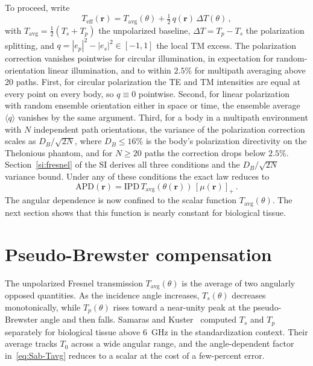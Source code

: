 \documentclass[journal,twocolumn,10pt]{IEEEtran}
\theoremstyle{plain}
\theoremstyle{remark}
\newcommand{\rr}{\mathbf{r}}
\newcommand{\IPD}{\mathrm{IPD}}
\newcommand{\APD}{\mathrm{APD}}
\newcommand{\Teff}{T_{\mathrm{eff}}}
\newcommand{\Tavg}{T_{\mathrm{avg}}}
\newcommand{\pospart}[1]{\left[#1\right]_{+}}
\begin{document}
To proceed, write
\begin{equation}\label{eq:Teff-decomp}
  \Teff(\rr) = \Tavg(\theta) + \tfrac{1}{2}\,q(\rr)\,\Delta T(\theta)\, ,
\end{equation}
with $\Tavg = \tfrac{1}{2}(T_s + T_p)$ the unpolarized baseline,
$\Delta T = T_p - T_s$ the polarization splitting, and $q = |e_p|^2 -
|e_s|^2 \in [-1, 1]$ the local TM excess. The polarization correction
vanishes pointwise for circular illumination, in expectation for
random-orientation linear illumination, and to within $2.5\%$ for
multipath averaging above 20 paths. First, for circular polarization
the TE and TM intensities are equal at every point on every body, so
$q \equiv 0$ pointwise. Second, for linear polarization with random
ensemble orientation either in space or time, the ensemble average
$\langle q\rangle$ vanishes by the same argument. Third, for a body
in a multipath environment with $N$ independent path orientations,
the variance of the polarization correction scales as $D_B/\sqrt{2N}$,
where $D_B \le 16\%$ is the body's polarization directivity on the
Thelonious phantom, and for $N \ge 20$ paths the correction drops
below $2.5\%$. Section~\ref{si:fresnel} of the SI derives all three
conditions and the $D_B/\sqrt{2N}$ variance bound. Under any of these conditions the exact law reduces to
\begin{equation}\label{eq:Sab-Tavg}
  \APD(\rr) = \IPD \, \Tavg(\theta(\rr)) \, \pospart{\mu(\rr)}\, .
\end{equation}
The angular dependence is now confined to the scalar function
$\Tavg(\theta)$. The next section shows that this function is nearly
constant for biological tissue.


\section{Pseudo-Brewster compensation}\label{sec:pB}

The unpolarized Fresnel transmission $\Tavg(\theta)$ is the average
of two angularly opposed quantities. As the incidence angle
increases, $T_s(\theta)$ decreases monotonically, while $T_p(\theta)$
rises toward a near-unity peak at the pseudo-Brewster angle and
then falls. Samaras and Kuster~\cite{Samaras2019} computed $T_s$ and
$T_p$ separately for biological tissue above $6$~GHz in the
standardization context. Their average tracks $T_0$ across a wide
angular range, and the angle-dependent factor in~\eqref{eq:Sab-Tavg}
reduces to a scalar at the cost of a few-percent error.
\end{document}
